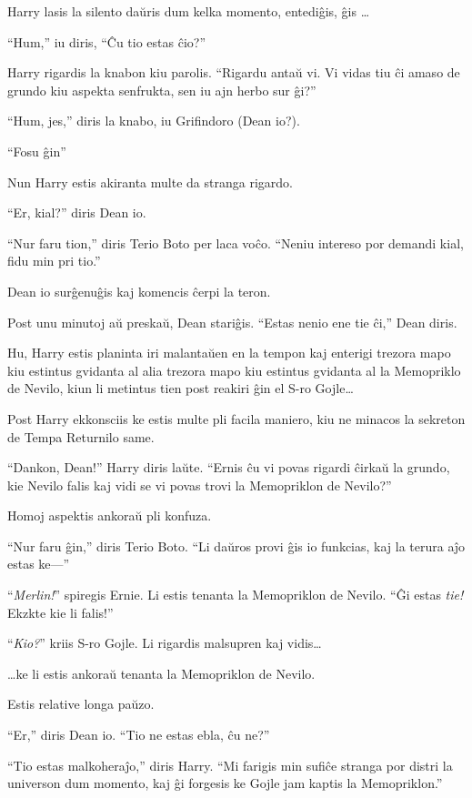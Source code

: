 Harry lasis la silento daŭris dum kelka momento, entediĝis, ĝis \ldots

``Hum,'' iu diris, ``Ĉu tio estas ĉio?''

Harry rigardis la knabon kiu parolis. ``Rigardu antaŭ vi. Vi vidas tiu
ĉi amaso de grundo kiu aspekta senfrukta, sen iu ajn herbo sur ĝi?''

``Hum, jes,'' diris la knabo, iu Grifindoro (Dean io?).

``Fosu ĝin''

Nun Harry estis akiranta multe da stranga rigardo.

``Er, kial?'' diris Dean io.

``Nur faru tion,'' diris Terio Boto per laca voĉo. ``Neniu intereso
por demandi kial, fidu min pri tio.''

Dean io surĝenuĝis kaj komencis ĉerpi la teron.

Post unu minutoj aŭ preskaŭ, Dean stariĝis. ``Estas nenio ene tie ĉi,'' Dean diris.

Hu, Harry estis planinta iri malantaŭen en la tempon kaj enterigi
trezora mapo kiu estintus gvidanta al alia trezora mapo kiu estintus
gvidanta al la Memopriklo de Nevilo, kiun li metintus tien post
reakiri ĝin el S-ro Gojle\ldots

Post Harry ekkonsciis ke estis multe pli facila maniero, kiu ne
minacos la sekreton de Tempa Returnilo same.

``Dankon, Dean!'' Harry diris laŭte. ``Ernis ĉu vi povas rigardi
ĉirkaŭ la grundo, kie Nevilo falis kaj vidi se vi povas trovi la
Memopriklon de Nevilo?''

Homoj aspektis ankoraŭ pli konfuza.

``Nur faru ĝin,'' diris Terio Boto. ``Li daŭros provi ĝis io funkcias, kaj la terura aĵo estas ke—''

``\emph{Merlin!}'' spiregis Ernie. Li estis tenanta la Memopriklon de
Nevilo. ``Ĝi estas \emph{tie!} Ekzkte kie li falis!''

``\emph{Kio?}'' kriis S-ro Gojle. Li rigardis malsupren kaj vidis\ldots

\ldots ke li estis ankoraŭ tenanta la Memopriklon de Nevilo.

Estis relative longa paŭzo.

``Er,'' diris Dean io. ``Tio ne estas ebla, ĉu ne?''

``Tio estas malkoheraĵo,'' diris Harry. ``Mi farigis min sufiĉe
stranga por distri la universon dum momento, kaj ĝi forgesis ke Gojle
jam kaptis la Memopriklon.''

